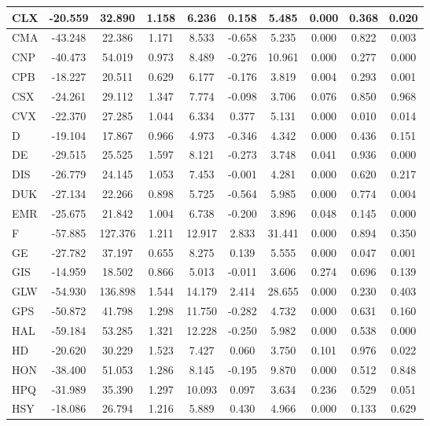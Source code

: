 \begin{table}
\begin{tabular}{l|c|c|c|c|c|c|c|c|c}
\hline
CLX & -20.559 & 32.890 & 1.158 & 6.236 & 0.158 & 5.485 & 0.000 & 0.368 & 0.020\\
\hline
CMA & -43.248 & 22.386 & 1.171 & 8.533 & -0.658 & 5.235 & 0.000 & 0.822 & 0.003\\
\hline
CNP & -40.473 & 54.019 & 0.973 & 8.489 & -0.276 & 10.961 & 0.000 & 0.277 & 0.000\\
\hline
CPB & -18.227 & 20.511 & 0.629 & 6.177 & -0.176 & 3.819 & 0.004 & 0.293 & 0.001\\
\hline
CSX & -24.261 & 29.112 & 1.347 & 7.774 & -0.098 & 3.706 & 0.076 & 0.850 & 0.968\\
\hline
CVX & -22.370 & 27.285 & 1.044 & 6.334 & 0.377 & 5.131 & 0.000 & 0.010 & 0.014\\
\hline
D & -19.104 & 17.867 & 0.966 & 4.973 & -0.346 & 4.342 & 0.000 & 0.436 & 0.151\\
\hline
DE & -29.515 & 25.525 & 1.597 & 8.121 & -0.273 & 3.748 & 0.041 & 0.936 & 0.000\\
\hline
DIS & -26.779 & 24.145 & 1.053 & 7.453 & -0.001 & 4.281 & 0.000 & 0.620 & 0.217\\
\hline
DUK & -27.134 & 22.266 & 0.898 & 5.725 & -0.564 & 5.985 & 0.000 & 0.774 & 0.004\\
\hline
EMR & -25.675 & 21.842 & 1.004 & 6.738 & -0.200 & 3.896 & 0.048 & 0.145 & 0.000\\
\hline
F & -57.885 & 127.376 & 1.211 & 12.917 & 2.833 & 31.441 & 0.000 & 0.894 & 0.350\\
\hline
GE & -27.782 & 37.197 & 0.655 & 8.275 & 0.139 & 5.555 & 0.000 & 0.047 & 0.001\\
\hline
GIS & -14.959 & 18.502 & 0.866 & 5.013 & -0.011 & 3.606 & 0.274 & 0.696 & 0.139\\
\hline
GLW & -54.930 & 136.898 & 1.544 & 14.179 & 2.414 & 28.655 & 0.000 & 0.230 & 0.403\\
\hline
GPS & -50.872 & 41.798 & 1.298 & 11.750 & -0.282 & 4.732 & 0.000 & 0.631 & 0.160\\
\hline
HAL & -59.184 & 53.285 & 1.321 & 12.228 & -0.250 & 5.982 & 0.000 & 0.538 & 0.000\\
\hline
HD & -20.620 & 30.229 & 1.523 & 7.427 & 0.060 & 3.750 & 0.101 & 0.976 & 0.022\\
\hline
HON & -38.400 & 51.053 & 1.286 & 8.145 & -0.195 & 9.870 & 0.000 & 0.512 & 0.848\\
\hline
HPQ & -31.989 & 35.390 & 1.297 & 10.093 & 0.097 & 3.634 & 0.236 & 0.529 & 0.051\\
\hline
HSY & -18.086 & 26.794 & 1.216 & 5.889 & 0.430 & 4.966 & 0.000 & 0.133 & 0.629\\

\end{tabular}
\end{table}

